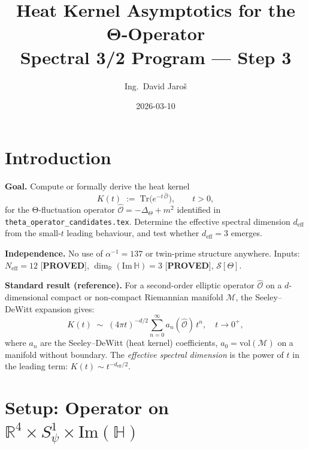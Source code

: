 \documentclass[11pt,a4paper]{article}
\title{Heat Kernel Asymptotics for the Θ-Operator\\
    \large Spectral 3/2 Program — Step 3}
\author{Ing.\ David Jaroš}
\date{2026-03-10}
\theoremstyle{definition}
\theoremstyle{remark}
\begin{document}
  \maketitle
\fi

\section{Introduction}
\label{sec:intro}

\textbf{Goal.}
Compute or formally derive the heat kernel
\begin{equation}
  K(t) \;:=\; \mathrm{Tr}\!\bigl(e^{-t\,\hat{\mathcal{O}}}\bigr),
  \qquad t > 0,
  \label{eq:K_def}
\end{equation}
for the Θ-fluctuation operator
$\hat{\mathcal{O}} = -\Delta_\Theta + m^2$
identified in \texttt{theta\_operator\_candidates.tex}.
Determine the effective spectral dimension $d_{\mathrm{eff}}$ from the
small-$t$ leading behaviour, and test whether $d_{\mathrm{eff}} = 3$ emerges.

\textbf{Independence.}
No use of $\alpha^{-1} = 137$ or twin-prime structure anywhere.
Inputs: $N_{\mathrm{eff}} = 12$ [\textbf{PROVED}],
$\dim_\mathbb{R}(\mathrm{Im}\,\mathbb{H}) = 3$ [\textbf{PROVED}],
$\mathcal{S}[\Theta]$.

\textbf{Standard result (reference).}
For a second-order elliptic operator $\hat{\mathcal{O}}$ on a
$d$-dimensional compact or non-compact Riemannian manifold $\mathcal{M}$,
the Seeley–DeWitt expansion gives:
\begin{equation}
  K(t) \;\sim\; (4\pi t)^{-d/2}
    \sum_{n=0}^{\infty} a_n(\hat{\mathcal{O}})\, t^n,
  \quad t \to 0^+,
  \label{eq:seeley_dewitt}
\end{equation}
where $a_n$ are the Seeley–DeWitt (heat kernel) coefficients,
$a_0 = \mathrm{vol}(\mathcal{M})$ on a manifold without boundary.
The \emph{effective spectral dimension} is the power of $t$ in the
leading term: $K(t) \sim t^{-d_{\mathrm{eff}}/2}$.

\section{Setup: Operator on $\mathbb{R}^4 \times S^1_\psi \times \mathrm{Im}(\mathbb{H})$}
\label{sec:setup}
\end{document}
